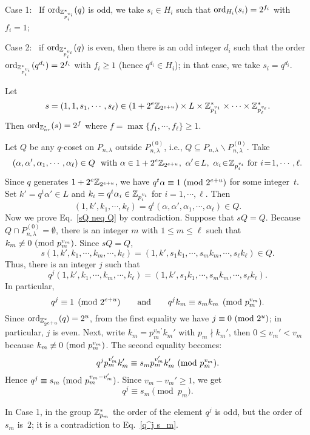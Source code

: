 \documentclass{article}
\numberwithin{equation}{section}
\numberwithin{table}{section}
\def\Z{{\Bbb Z}}
\begin{document}
 Case 1:~
If ${\rm ord}_{\Z_{p_i^{v_i}}^*}(q)$ is odd, we take $s_i\in H_i$ such that
${\rm ord}_{H_i}(s_i)=2^{f_i}$ with $f_i=1$;

 Case 2:~
if ${\rm ord}_{\Z_{p_i^{v_i}}^*}(q)$ is even, then there is an odd integer $d_i$
such that the order ${\rm ord}_{\Z_{p_i^{v_i}}^*}(q^{d_i})=2^{f_i}$
with $f_i\ge 1$ (hence $q^{d_i}\in H_i$);
in that case, we take $s_i=q^{d_i}$.

\noindent
Let
$$s=(1,1,s_1,\cdots,s_\ell)\in (1+2^e\Z_{2^{e+u}})\times L
 \times \Z_{p_1^{v_1}}^*\times\cdots\times\Z_{p_\ell^{v_\ell}}^*.$$
Then ${\rm ord}_{\Z_{nr}^*}(s)=2^f$ where
$f=\max\{f_1,\cdots,f_\ell\}\ge 1$.

Let $Q$ be any $q$-coset on $P_{n,\lambda}$ outside $P_{n,\lambda}^{(0)}$,
i.e., $Q\subseteq P_{n,\lambda}\backslash P_{n,\lambda}^{(0)}$.
Take
$$(\alpha,\alpha',\alpha_1,\cdots,\alpha_\ell)\in Q~~\mbox{with}~
 \alpha\in 1+2^e\Z_{2^{e+u}},~\alpha'\!\in\! L,~
 \alpha_i\!\in\!\Z_{p_i^{v_i}}~\mbox{for}~i\!=\!1,\cdots,\ell.
$$
Since $q$ generates $1+2^e\Z_{2^{e+u}}$,
we have $q^t\alpha\equiv 1~({\rm mod}~2^{e+u})$ for some integer~$t$.
Set $k'=q^t\alpha'\in L$ and $k_i=q^t\alpha_i\in\Z_{p_i^{v_i}}$
for $i=1,\cdots,\ell$. Then
$$
 (1,k',k_1,\cdots,k_\ell)=q^t(\alpha,\alpha',\alpha_1,\cdots,\alpha_\ell)\in Q.
$$
Now we prove Eq.~\eqref{sQ neq Q} by contradiction.
Suppose that $sQ=Q$. Because $Q\cap P_{n,\lambda}^{(0)}=\emptyset$,
there is an integer $m$ with $1\le m\le \ell$
such that $k_m\not\equiv 0~({\rm mod}~p_m^{v_m})$.
Since $sQ=Q$,
$$ s(1,k',k_1,\cdots,k_m,\cdots,k_\ell)
=(1,k',s_1k_1,\cdots,s_mk_m,\cdots,s_\ell k_\ell)\in Q.$$
Thus, there is an integer $j$ such that
$$
 q^j(1,k',k_1,\cdots,k_m,\cdots,k_\ell)=(1,k',s_1k_1,\cdots,s_mk_m,\cdots,s_\ell k_\ell).
$$
In particular,
$$q^j\equiv 1\pmod{2^{e+u}}\qquad{\rm and}
 \qquad q^jk_m\equiv s_mk_m\pmod {p_m^{v_m}}.$$
Since ${\rm ord}_{\Z_{2^{e+u}}^*}(q)=2^u$, from the first equality
we have $j\equiv 0~({\rm mod}~2^u)$; in particular, $j$ is even.
Next, write $k_m=p_m^{v_m'}k_m'$ with $p_m\nmid k_m'$,
then $0\le v_m'<v_m$ because $k_m\not\equiv 0~({\rm mod}~p_m^{v_m})$.
The second equality becomes:
$$q^jp_m^{v_m'}k_m'\equiv s_mp_m^{v_m'}k_m'~({\rm mod}~p_m^{v_m}).$$
Hence $q^j\equiv s_m~({\rm mod}~p_m^{v_m-v_m'})$. Since $v_m-v_m'\ge 1$, we get
\begin{equation}\label{q^j s_m}
 q^j\equiv s_m \pmod {p_m}.
\end{equation}

In Case 1, in the group $\Z_{p_m}^*$ the order of the element $q^j$ is odd,
but the order of $s_m$ is~$2$; it is a contradiction to Eq.~\eqref{q^j s_m}.
\end{document}
